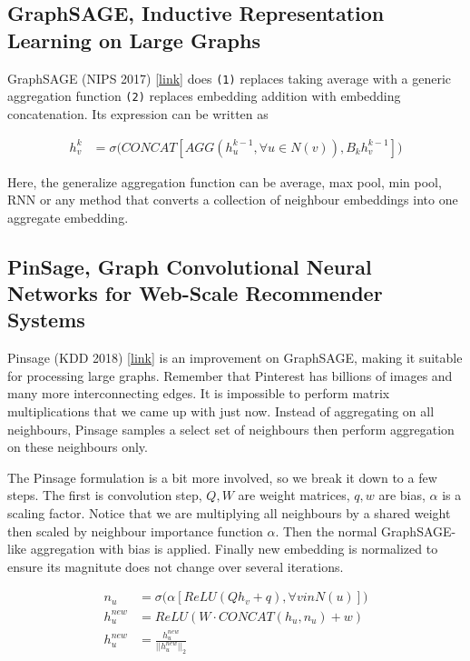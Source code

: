 \subsection{GraphSAGE, Inductive Representation Learning on Large Graphs} \label{ss_54_sage}

GraphSAGE (NIPS 2017) \href{https://arxiv.org/pdf/1706.02216.pdf}{[link]} does \texttt{(1)} replaces taking average with a generic aggregation function \texttt{(2)} replaces embedding addition with embedding concatenation. Its expression can be written as 

\begin{align}
    h_v^k &= \sigma\Big( CONCAT[AGG(h_u^{k-1}, \forall u \in N(v)), B_kh_v^{k-1} ]\Big)
\end{align}{}

Here, the generalize aggregation function can be average, max pool, min pool, RNN or any method that converts a collection of neighbour embeddings into one aggregate embedding.

\subsection{PinSage, Graph Convolutional Neural Networks for Web-Scale Recommender Systems} \label{ss_55_pin_sage}

Pinsage (KDD 2018) \href{https://arxiv.org/pdf/1806.01973.pdf}{[link]} is an improvement on GraphSAGE, making it suitable for processing large graphs. Remember that Pinterest has billions of images and many more interconnecting edges. It is impossible to perform matrix multiplications that we came up with just now. Instead of aggregating on all neighbours, Pinsage samples a select set of neighbours then perform aggregation on these neighbours only. 

The Pinsage formulation is a bit more involved, so we break it down to a few steps. The first is convolution step, $Q, W$ are weight matrices, $q, w$ are bias, $\alpha$ is a scaling factor. Notice that we are multiplying all neighbours by a shared weight then scaled by neighbour importance function $\alpha$. Then the normal GraphSAGE-like aggregation with bias is applied. Finally new embedding is normalized to ensure its magnitute does not change over several iterations.

\begin{align}
    n_u &= \sigma\Big(\alpha[ReLU(Qh_v + q), \forall v in N(u)]\Big) \\
    h_u^{new} &= ReLU(W \cdot CONCAT(h_u, n_u) + w) \\
    h_u^{new} &= \frac{h_u^{new}}{||h_u^{new}||_2}
\end{align}{}

